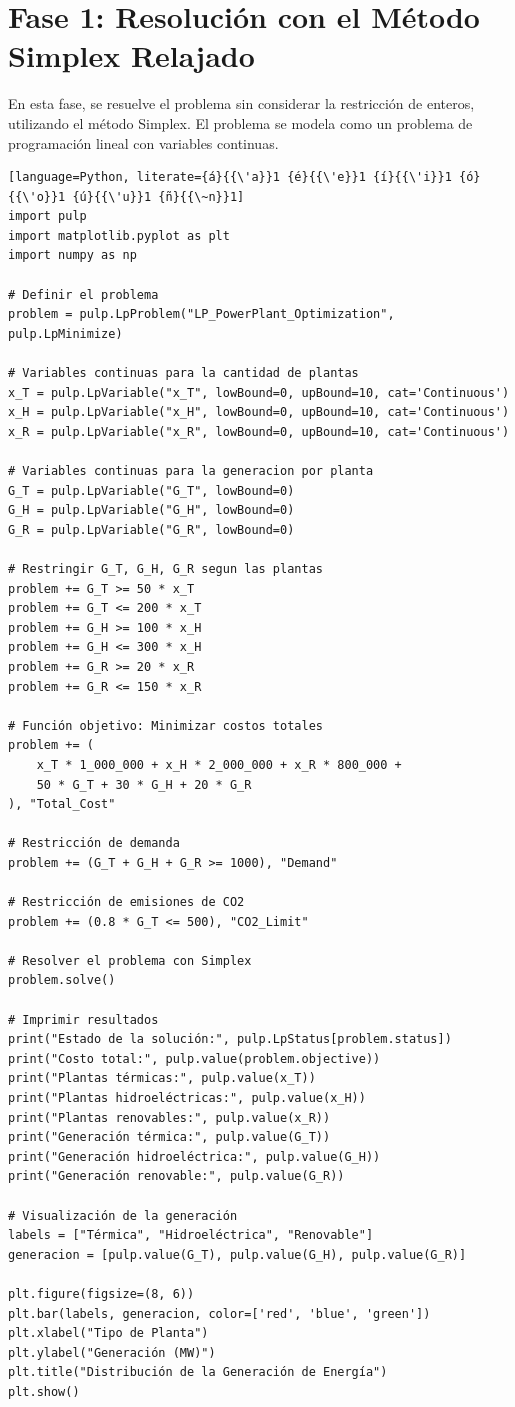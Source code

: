 \documentclass{article}
\begin{document}
\section*{Fase 1: Resolución con el Método Simplex Relajado}
En esta fase, se resuelve el problema sin considerar la restricción de enteros, utilizando el método Simplex. El problema se modela como un problema de programación lineal con variables continuas.
\\
\begin{lstlisting}[language=Python, literate={á}{{\'a}}1 {é}{{\'e}}1 {í}{{\'i}}1 {ó}{{\'o}}1 {ú}{{\'u}}1 {ñ}{{\~n}}1]
import pulp
import matplotlib.pyplot as plt
import numpy as np

# Definir el problema
problem = pulp.LpProblem("LP_PowerPlant_Optimization", pulp.LpMinimize)

# Variables continuas para la cantidad de plantas
x_T = pulp.LpVariable("x_T", lowBound=0, upBound=10, cat='Continuous')
x_H = pulp.LpVariable("x_H", lowBound=0, upBound=10, cat='Continuous')
x_R = pulp.LpVariable("x_R", lowBound=0, upBound=10, cat='Continuous')

# Variables continuas para la generacion por planta
G_T = pulp.LpVariable("G_T", lowBound=0)
G_H = pulp.LpVariable("G_H", lowBound=0)
G_R = pulp.LpVariable("G_R", lowBound=0)

# Restringir G_T, G_H, G_R segun las plantas
problem += G_T >= 50 * x_T
problem += G_T <= 200 * x_T
problem += G_H >= 100 * x_H
problem += G_H <= 300 * x_H
problem += G_R >= 20 * x_R
problem += G_R <= 150 * x_R

# Función objetivo: Minimizar costos totales
problem += (
    x_T * 1_000_000 + x_H * 2_000_000 + x_R * 800_000 +
    50 * G_T + 30 * G_H + 20 * G_R
), "Total_Cost"

# Restricción de demanda
problem += (G_T + G_H + G_R >= 1000), "Demand"

# Restricción de emisiones de CO2
problem += (0.8 * G_T <= 500), "CO2_Limit"

# Resolver el problema con Simplex
problem.solve()

# Imprimir resultados
print("Estado de la solución:", pulp.LpStatus[problem.status])
print("Costo total:", pulp.value(problem.objective))
print("Plantas térmicas:", pulp.value(x_T))
print("Plantas hidroeléctricas:", pulp.value(x_H))
print("Plantas renovables:", pulp.value(x_R))
print("Generación térmica:", pulp.value(G_T))
print("Generación hidroeléctrica:", pulp.value(G_H))
print("Generación renovable:", pulp.value(G_R))

# Visualización de la generación
labels = ["Térmica", "Hidroeléctrica", "Renovable"]
generacion = [pulp.value(G_T), pulp.value(G_H), pulp.value(G_R)]

plt.figure(figsize=(8, 6))
plt.bar(labels, generacion, color=['red', 'blue', 'green'])
plt.xlabel("Tipo de Planta")
plt.ylabel("Generación (MW)")
plt.title("Distribución de la Generación de Energía")
plt.show()
\end{lstlisting}
\end{document}
